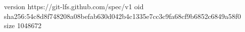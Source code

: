 version https://git-lfs.github.com/spec/v1
oid sha256:54c8d8f748208a08befab630d042b4c1335e7cc3c9fa68cf9b6852c6849a58f0
size 1048672
